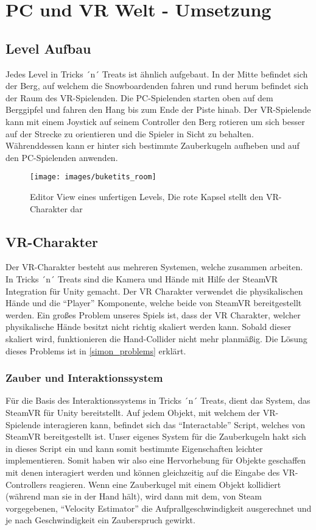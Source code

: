 \chapter{PC und VR Welt - Umsetzung}
\section{Level Aufbau}
Jedes Level in Tricks ´n´ Treats ist ähnlich aufgebaut. 
In der Mitte befindet sich der Berg, auf welchem die Snowboardenden fahren und rund herum befindet sich der Raum des VR-Spielenden. Die PC-Spielenden starten oben auf dem Berggipfel und fahren den Hang bis zum Ende der Piste hinab. Der VR-Spielende kann mit einem Joystick auf seinem Controller den Berg rotieren um sich besser auf der Strecke zu orientieren und die Spieler in Sicht zu behalten. Währenddessen kann er hinter sich bestimmte Zauberkugeln aufheben und auf den PC-Spielenden anwenden.

\begin{figure}[H]
	\centering
	\texttt{[image: images/buketits\_room]}
	\caption{Editor View eines unfertigen Levels, Die rote Kapsel stellt den VR-Charakter dar}
\end{figure}

\section{VR-Charakter} \label{simon_vrspieler}
Der VR-Charakter besteht aus mehreren Systemen, welche zusammen arbeiten. In Tricks ´n´ Treats sind die Kamera und Hände mit Hilfe der SteamVR Integration für Unity gemacht. Der VR Charakter verwendet die physikalischen Hände und die "`Player"' Komponente, welche beide von SteamVR bereitgestellt werden. Ein großes Problem unseres Spiels ist, dass der VR Charakter, welcher physikalische Hände besitzt nicht richtig skaliert werden kann. Sobald dieser skaliert wird, funktionieren die Hand-Collider nicht mehr planmäßig. Die Lösung dieses Problems ist in \ref{simon_problems} erklärt.

\subsection{Zauber und Interaktionssystem}
Für die Basis des Interaktionssystems in Tricks ´n´ Treats, dient das System, das SteamVR für Unity bereitstellt. Auf jedem Objekt, mit welchem der VR-Spielende interagieren kann, befindet sich das "`Interactable"' Script, welches von SteamVR bereitgestellt ist. Unser eigenes System für die Zauberkugeln hakt sich in dieses Script ein und kann somit bestimmte Eigenschaften leichter implementieren. Somit haben wir also eine Hervorhebung für Objekte geschaffen mit denen interagiert werden und können gleichzeitig auf die Eingabe des VR-Controllers reagieren. Wenn eine Zauberkugel mit einem Objekt kollidiert (während man sie in der Hand hält), wird dann mit dem, von Steam vorgegebenen, "`Velocity Estimator"' die Aufprallgeschwindigkeit ausgerechnet und je nach Geschwindigkeit ein Zauberspruch gewirkt.


